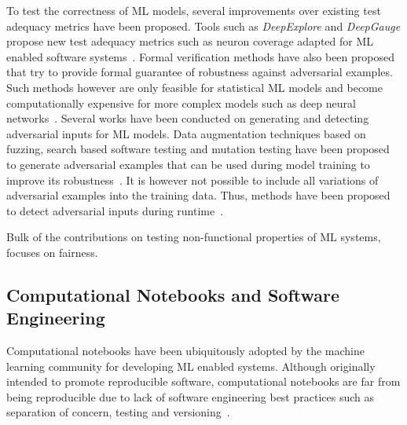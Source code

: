 \documentclass[acmsmall,screen,review,anonymous]{acmart}
\begin{document}
To test the correctness of ML models, several improvements over existing test adequacy metrics have been proposed. Tools such as \textit{DeepExplore} and \textit{DeepGauge} propose new test adequacy metrics such as neuron coverage adapted for ML enabled software systems~\cite{pei2017deepexplore, ma2018deepgauge, gerasimou2020importance}. Formal verification methods have also been proposed that try to provide formal guarantee of robustness against adversarial examples. Such methods however are only feasible for statistical ML models and become computationally expensive for more complex models such as deep neural networks~\cite{zhu2021deepmemory, baluta2021scalable}. Several works have been conducted on generating and detecting adversarial inputs for ML models. Data augmentation techniques based on fuzzing, search based software testing and mutation testing have been proposed to generate adversarial examples that can be used during model training to improve its robustness~\cite{braiek2019deepevolution, gao2020fuzz, wang2021robot, zhang2020white}. It is however not possible to include all variations of adversarial examples into the training data. Thus, methods have been proposed to detect adversarial inputs during runtime~\cite{xiao2021self, wang2020dissector, wang2019adversarial, berend2020cats}.

Bulk of the contributions on testing non-functional properties of ML systems, focuses on fairness.

\subsection{Computational Notebooks and Software
  Engineering}\label{sec:notebooks}

Computational notebooks have been ubiquitously adopted by the machine learning community for developing ML enabled systems. Although originally intended to promote reproducible software, computational notebooks are far from being reproducible due to lack of software engineering best practices such as separation of concern, testing and versioning~\cite{pimentel2019large}.
\end{document}
